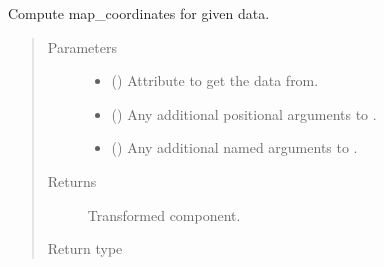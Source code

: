 \documentclass[letterpaper,10pt,english]{sphinxmanual}
\begin{document}
\begin{fulllineitems}
\begin{fulllineitems}
\label{\detokenize{api/base_classes:geology.src.base_spatial.SpatialComponent.map_coordinates}}
Compute map\_coordinates for given data.
\begin{quote}\begin{description}
\item[{Parameters}] \leavevmode\begin{itemize}
\item {} 
 (\sphinxstyleliteralemphasis{\sphinxupquote{, }}) \textendash{} Attribute to get the data from.

\item {} 
 () \textendash{} Any additional positional arguments to .

\item {} 
 () \textendash{} Any additional named arguments to .

\end{itemize}

\item[{Returns}] \leavevmode
{} \textendash{} Transformed component.

\item[{Return type}] \leavevmode
{\hyperref[\detokenize{api/base_classes:geology.src.base_spatial.SpatialComponent}]{}}

\end{description}\end{quote}

\end{fulllineitems}



\end{fulllineitems}
\end{document}
